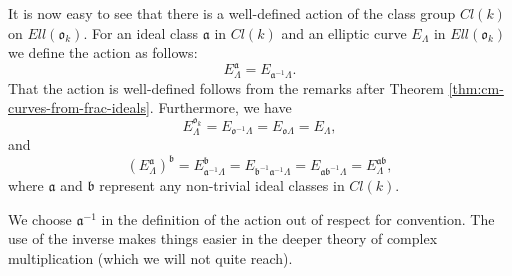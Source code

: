 It is now easy to see that there is a well-defined action of the class group $Cl(k)$
on $Ell(\mathfrak{o}_{k})$.  For an ideal class $\mathfrak{a}$ in $Cl(k)$ and an
elliptic curve $E_{\Lambda}$ in $Ell(\mathfrak{o}_{k})$ we define the action as
follows:
\begin{equation*}
  E_{\Lambda}^{\mathfrak{a}} = E_{\mathfrak{a}^{-1}\Lambda}.
\end{equation*}
That the action is well-defined follows from the remarks after Theorem
\ref{thm:cm-curves-from-frac-ideals}.  Furthermore, we have
\begin{equation*}
  E_{\Lambda}^{\mathfrak{o}_{k}} = E_{\mathfrak{o}^{-1}\Lambda} =
  E_{\mathfrak{o}\Lambda} = E_{\Lambda},
\end{equation*}
and
\begin{equation*}
  (E_{\Lambda}^{\mathfrak{a}})^{\mathfrak{b}} =
  E_{\mathfrak{a}^{-1}\Lambda}^{\mathfrak{b}} =
  E_{\mathfrak{b}^{-1}\mathfrak{a}^{-1}\Lambda} = E_{\mathfrak{ab}^{-1}\Lambda} = E_{\Lambda}^{\mathfrak{ab}},
\end{equation*}
where $\mathfrak{a}$ and $\mathfrak{b}$ represent any non-trivial ideal classes in
$Cl(k)$.
\begin{rem}
  \label{rem:convention-on-group-action}
  We choose $\mathfrak{a}^{-1}$ in the definition of the action out of respect for
  convention.  The use of the inverse makes things easier in the deeper theory of
  complex multiplication (which we will not quite reach).
\end{rem}

